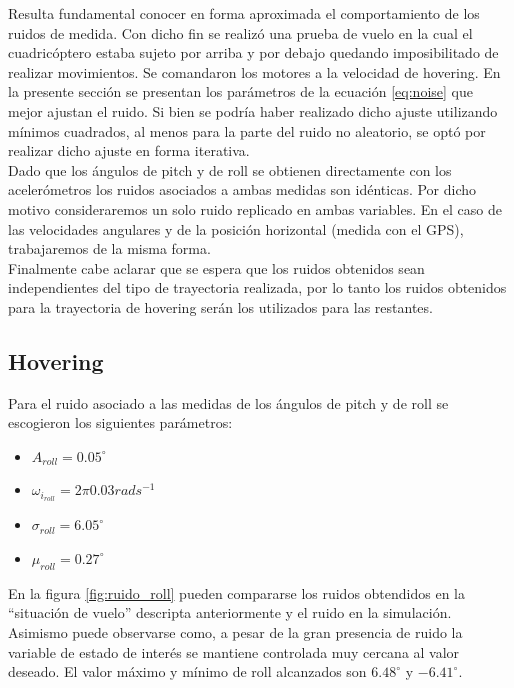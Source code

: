 \documentclass[main]{subfiles}
\begin{document}
Resulta fundamental conocer en forma aproximada el comportamiento de los ruidos de medida. Con dicho fin se realiz\'o una prueba de vuelo en la cual el cuadric\'optero estaba sujeto por arriba y por debajo quedando imposibilitado de realizar movimientos. Se comandaron los motores a la velocidad de hovering. En la presente secci\'on se presentan los par\'ametros de la ecuaci\'on \ref{eq:noise} que mejor ajustan el ruido. Si bien se podr\'ia haber realizado dicho ajuste utilizando m\'inimos cuadrados, al menos para la parte del ruido no aleatorio, se opt\'o por realizar dicho ajuste en forma iterativa.\\

Dado que los \'angulos de pitch y de roll se obtienen directamente con los aceler\'ometros los ruidos asociados a ambas medidas son id\'enticas. Por dicho motivo consideraremos un solo ruido replicado en ambas variables. En el caso de las velocidades angulares y de la posici\'on horizontal (medida con el GPS), trabajaremos de la misma forma.\\ 

Finalmente cabe aclarar que se espera que los ruidos obtenidos sean independientes del tipo de trayectoria realizada, por lo tanto los ruidos obtenidos para la trayectoria de hovering ser\'an los utilizados para las restantes. 
\subsection{Hovering}

Para el ruido asociado a las medidas de los \'angulos de pitch y de roll se escogieron los siguientes par\'ametros:

\begin{itemize}
\item $A_{roll} = 0.05^\circ$
\item $\omega_{i_{roll}} = 2\pi 0.03 rads^{-1}$
\item $\sigma_{roll} = 6.05^\circ$
\item $\mu_{roll} = 0.27 ^\circ$
\end{itemize}
  
En la figura \ref{fig:ruido_roll} pueden compararse los ruidos obtendidos en la ``situaci\'on de vuelo'' descripta anteriormente y el ruido en la simulaci\'on. Asimismo puede observarse como, a pesar de la gran presencia de ruido la variable de estado de inter\'es se mantiene controlada muy cercana al valor deseado. El valor m\'aximo y m\'inimo de roll alcanzados son $6.48^\circ$ y $-6.41^\circ$.\\
\end{document}
